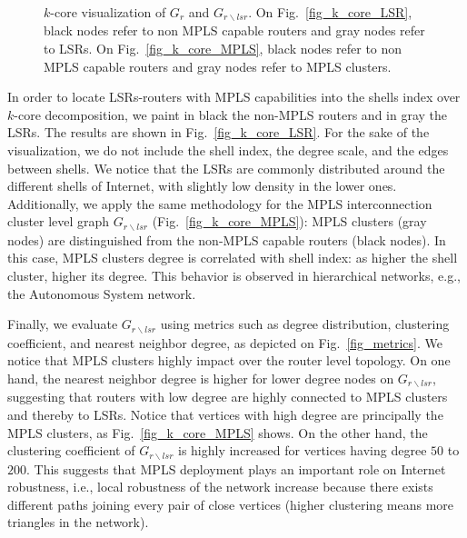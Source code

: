 \begin{figure*}[!t]
  \begin{center}
\hfil
  \end{center}
\vspace{-0.5cm}  
  \caption{$k$-core visualization of $G_r$ and $G_{r \backslash lsr}$.  On
  Fig.~\ref{fig_k_core_LSR}, black nodes refer to non MPLS capable routers and
  gray nodes refer to LSRs.  On Fig.~\ref{fig_k_core_MPLS}, black nodes refer to
  non MPLS capable routers and gray nodes refer to MPLS clusters.} 
  \label{fig_kcore_overview}
\end{figure*}

In order to locate LSRs-routers with MPLS capabilities into the shells index
over $k$-core decomposition, we paint in black the non-MPLS routers and in gray
the LSRs. The results are shown in Fig.~\ref{fig_k_core_LSR}.  For the sake of
the visualization, we do not include the shell index, the degree scale, and the
edges between shells. We notice that the LSRs are commonly distributed around
the different shells of Internet, with slightly low density in the lower ones.
Additionally, we apply the same methodology for the MPLS interconnection cluster
level graph $G_{r\backslash lsr}$ (Fig.~\ref{fig_k_core_MPLS}): MPLS clusters
(gray nodes) are distinguished from the non-MPLS capable routers (black nodes).
In this case,  MPLS clusters  degree is correlated with shell index: as higher
the shell cluster, higher its degree. This behavior is observed in hierarchical
networks, e.g., the Autonomous System network.

Finally, we evaluate $G_{r \backslash lsr }$ using metrics such as degree
distribution, clustering coefficient, and nearest neighbor degree, as depicted
on Fig.~\ref{fig_metrics}. We notice that MPLS clusters highly impact over the
router level topology. On one hand, the nearest neighbor degree is higher for
lower degree nodes on $G_{r \backslash lsr}$, suggesting that routers with low
degree are highly connected to MPLS clusters and thereby to LSRs. Notice that
vertices with high degree are principally the MPLS clusters, as
Fig.~\ref{fig_k_core_MPLS} shows. On the other hand, the clustering coefficient
of $G_{r \backslash lsr }$ is highly increased for vertices having degree $50$
to $200$. This suggests that MPLS deployment plays an important role on
Internet robustness, i.e., local robustness of the network increase because
there exists different paths joining every pair of close vertices (higher
clustering means more triangles in the network).

